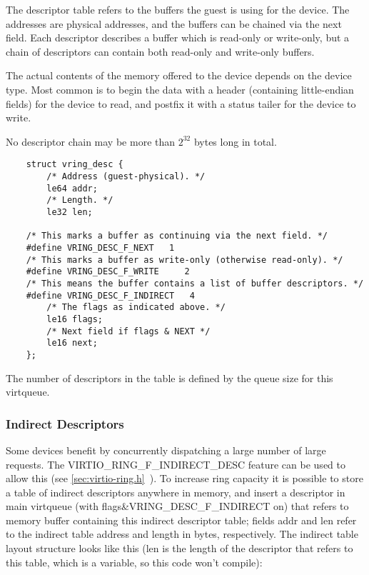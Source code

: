 The descriptor table refers to the buffers the guest is using for
the device. The addresses are physical addresses, and the buffers
can be chained via the next field. Each descriptor describes a
buffer which is read-only or write-only, but a chain of
descriptors can contain both read-only and write-only buffers.

The actual contents of the memory offered to the device depends on the
device type.  Most common is to begin the data with a header
(containing little-endian fields) for the device to read, and postfix
it with a status tailer for the device to write.

No descriptor chain may be more than $2^{32}$ bytes long in total.

\begin{lstlisting}
	struct vring_desc {
		/* Address (guest-physical). */
		le64 addr;
		/* Length. */
		le32 len;

	/* This marks a buffer as continuing via the next field. */
	#define VRING_DESC_F_NEXT   1
	/* This marks a buffer as write-only (otherwise read-only). */
	#define VRING_DESC_F_WRITE     2
	/* This means the buffer contains a list of buffer descriptors. */
	#define VRING_DESC_F_INDIRECT   4
		/* The flags as indicated above. */
		le16 flags;
		/* Next field if flags & NEXT */
		le16 next;
	};
\end{lstlisting}

The number of descriptors in the table is defined by the queue size
for this virtqueue.

\subsubsection{Indirect Descriptors}\label{sec:Basic Facilities of a Virtio Device / Virtqueues / The Virtqueue Descriptor Table / Indirect Descriptors}

Some devices benefit by concurrently dispatching a large number
of large requests. The VIRTIO_RING_F_INDIRECT_DESC feature can be
used to allow this (see \ref{sec:virtio-ring.h}~). To increase
ring capacity it is possible to store a table of indirect
descriptors anywhere in memory, and insert a descriptor in main
virtqueue (with flags\&VRING_DESC_F_INDIRECT on) that refers to memory buffer
containing this indirect descriptor table; fields addr and len
refer to the indirect table address and length in bytes,
respectively. The indirect table layout structure looks like this
(len is the length of the descriptor that refers to this table,
which is a variable, so this code won't compile):

